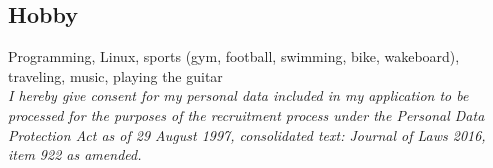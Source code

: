 \documentclass[8pt]{extarticle}
\begin{document}
    \subsection*{\normalsize{Hobby}}
    Programming, Linux, sports (gym, football, swimming, bike, wakeboard), traveling, music, playing the guitar\\

    \textit{
    I hereby give consent for my personal data included in my application
    to be processed for the purposes of the recruitment process
    under the Personal Data Protection Act as of 29 August 1997,
    consolidated text: Journal of Laws 2016, item 922 as amended.
    }
\end{document}
